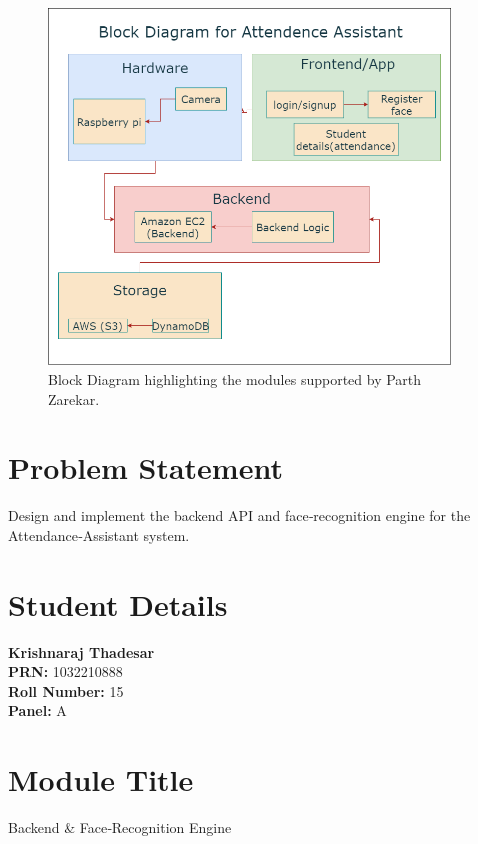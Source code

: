 \documentclass[openany]{report}
\begin{document}
\begin{figure}[H]
    \centering
    \includegraphics[width=0.95\textwidth]{../imgs/block diagram.png}
    \caption{Block Diagram highlighting the modules supported by Parth Zarekar.}
    \label{fig:block_diagram_parth}
  \end{figure}
\section{Problem Statement}
Design and implement the backend API and face‐recognition engine for the Attendance‐Assistant system.

\section{Student Details}
\textbf{Krishnaraj Thadesar} \\
\textbf{PRN:} 1032210888 \\
\textbf{Roll Number:} 15 \\
\textbf{Panel:} A \\

\section{Module Title}
Backend \& Face‐Recognition Engine
\end{document}
